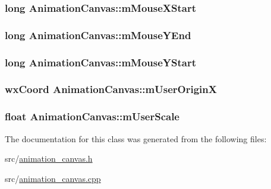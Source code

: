\hypertarget{a00011_a1274fba3c24501db2e78c8304a05b5f4}{
\subsubsection[{m\-Mouse\-X\-Start}]{\setlength{\rightskip}{0pt plus 5cm}long Animation\-Canvas\-::m\-Mouse\-X\-Start\hspace{0.3cm}{\ttfamily [private]}}}\label{a00011_a1274fba3c24501db2e78c8304a05b5f4}
\hypertarget{a00011_a502c5a9601e4355fb7f6fc69c357ce83}{
\subsubsection[{m\-Mouse\-Y\-End}]{\setlength{\rightskip}{0pt plus 5cm}long Animation\-Canvas\-::m\-Mouse\-Y\-End\hspace{0.3cm}{\ttfamily [private]}}}\label{a00011_a502c5a9601e4355fb7f6fc69c357ce83}
\hypertarget{a00011_a21bb228cd51fecf39cae7064b5668486}{
\subsubsection[{m\-Mouse\-Y\-Start}]{\setlength{\rightskip}{0pt plus 5cm}long Animation\-Canvas\-::m\-Mouse\-Y\-Start\hspace{0.3cm}{\ttfamily [private]}}}\label{a00011_a21bb228cd51fecf39cae7064b5668486}
\hypertarget{a00011_aab7e581755be241f33566dae39b7737f}{
\subsubsection[{m\-User\-Origin\-X}]{\setlength{\rightskip}{0pt plus 5cm}wx\-Coord Animation\-Canvas\-::m\-User\-Origin\-X\hspace{0.3cm}{\ttfamily [private]}}}\label{a00011_aab7e581755be241f33566dae39b7737f}
\hypertarget{a00011_ab2f7205a34a828219d20e19d5d035804}{
\subsubsection[{m\-User\-Scale}]{\setlength{\rightskip}{0pt plus 5cm}float Animation\-Canvas\-::m\-User\-Scale\hspace{0.3cm}{\ttfamily [private]}}}\label{a00011_ab2f7205a34a828219d20e19d5d035804}


The documentation for this class was generated from the following files\-:\begin{DoxyCompactItemize}
\item 
src/\hyperlink{a00169}{animation\-\_\-canvas.\-h}\item 
src/\hyperlink{a00168}{animation\-\_\-canvas.\-cpp}\end{DoxyCompactItemize}
